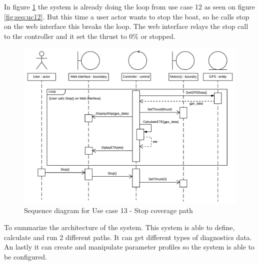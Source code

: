 In figure \ref{fig:seq:uc13} the system is already doing the loop from use case 12 as seen on figure \ref{fig:seq:uc12}. But this time a user actor wants to stop the boat, so he calls stop on the web interface this breaks the loop. The web interface relays the stop call to the controller and it set the thrust to 0\% or stopped.

\begin{figure}[H]
	\centering
	\includegraphics[width=1\linewidth]{Images/System_architecture/Use_case_13_SD}
	\caption{Sequence diagram for Use case 13 - Stop coverage path}
	\label{fig:seq:uc13}
\end{figure}


To summarize the architecture of the system. This system is able to define, calculate and run 2 different paths. It can get different types of diagnostics data. An lastly it can create and manipulate parameter profiles so the system is able to be configured. 




